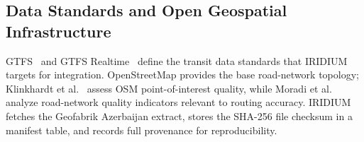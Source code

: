 \subsection{Data Standards and Open Geospatial Infrastructure}

GTFS~\cite{gtfs_overview} and GTFS Realtime~\cite{gtfs_realtime_overview}
define the transit data standards that IRIDIUM targets for integration.
OpenStreetMap provides the base road-network topology; Klinkhardt et al.\
\cite{klinkhardt2023osm_poi_quality} assess OSM point-of-interest quality,
while Moradi et al.\ \cite{moradi2022osm_road_quality} analyze road-network
quality indicators relevant to routing accuracy.
IRIDIUM fetches the Geofabrik Azerbaijan extract, stores the SHA-256 file
checksum in a manifest table, and records full provenance for
reproducibility.
